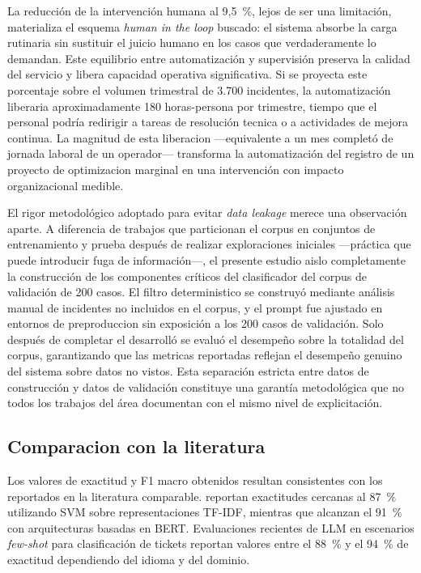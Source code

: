 La reducción de la intervención humana al 9,5~\%, lejos de ser una limitación, materializa el esquema \emph{human in the loop} buscado: el sistema absorbe la carga rutinaria sin sustituir el juicio humano en los casos que verdaderamente lo demandan. Este equilibrio entre automatización y supervisión preserva la calidad del servicio y libera capacidad operativa significativa. Si se proyecta este porcentaje sobre el volumen trimestral de 3.700 incidentes, la automatización liberaria aproximadamente 180 horas-persona por trimestre, tiempo que el personal podría redirigir a tareas de resolución tecnica o a actividades de mejora continua. La magnitud de esta liberacion ---equivalente a un mes completó de jornada laboral de un operador--- transforma la automatización del registro de un proyecto de optimizacion marginal en una intervención con impacto organizacional medible.

El rigor metodológico adoptado para evitar \emph{data leakage} merece una observación aparte. A diferencia de trabajos que particionan el corpus en conjuntos de entrenamiento y prueba después de realizar exploraciones iniciales ---práctica que puede introducir fuga de información---, el presente estudio aislo completamente la construcción de los componentes críticos del clasificador del corpus de validación de 200 casos. El filtro deterministico se construyó mediante análisis manual de incidentes no incluidos en el corpus, y el prompt fue ajustado en entornos de preproduccion sin exposición a los 200 casos de validación. Solo después de completar el desarrolló se evaluó el desempeño sobre la totalidad del corpus, garantizando que las metricas reportadas reflejan el desempeño genuino del sistema sobre datos no vistos. Esta separación estricta entre datos de construcción y datos de validación constituye una garantía metodológica que no todos los trabajos del área documentan con el mismo nivel de explicitación.

\subsection{Comparacion con la literatura}

Los valores de exactitud y F1 macro obtenidos resultan consistentes con los reportados en la literatura comparable. \textcite{Paramesh2019_it_service_desk} reportan exactitudes cercanas al 87~\% utilizando SVM sobre representaciones TF-IDF, mientras que \textcite{Revina2020_bert_tickets} alcanzan el 91~\% con arquitecturas basadas en BERT. Evaluaciones recientes de LLM en escenarios \emph{few-shot} para clasificación de tickets reportan valores entre el 88~\% y el 94~\% de exactitud dependiendo del idioma y del dominio.

